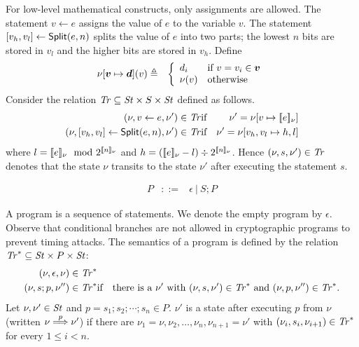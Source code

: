 For low-level mathematical constructs, only assignments are allowed.
The statement $v \leftarrow e$ assigns the value of $e$
to the variable $v$. The statement ${[}{v_h}, {v_l}{]} \leftarrow
\mbox{\textsf{Split}}(e, n)$ splits the value of $e$ into two parts;
the lowest $n$ bits are stored in $v_l$ and the higher bits
are stored in $v_h$. Define
\begin{eqnarray*}
\nu[\vv \mapsto \vd](v) & \defn &
\left\{
   \begin{array}{ll}
     d_i & \textmd{if $v = v_i \in \vv$}\\
     \nu(v) & \textmd{otherwise}
   \end{array}
\right.
\end{eqnarray*}
Consider the relation $\mathit{Tr} \subseteq \mathit{St} \times S \times \mathit{St}$ defined
as follows. 
\begin{eqnarray*}
  (\nu, v \leftarrow e, \nu') \in \mathit{Tr} & \textmd{if} &
  \nu' = \nu[v \mapsto [\![{e}]\!]_{\nu}]\\
  (\nu, {[}{v_h}, {v_l}{]} \leftarrow \mbox{\textsf{Split}} (e, n), \nu') \in
  \mathit{Tr} & \textmd{if} &
  \nu' = \nu[v_h, v_l \mapsto h, l]
\end{eqnarray*}
where
$l = [\![{e}]\!]_{\nu} \mod 2^{[\![{n}]\!]_{\nu}}$ and
$h = ([\![{e}]\!]_{\nu} - l) \div 2^{[\![{n}]\!]_{\nu}}$.
Hence $(\nu, s, \nu') \in \mathit{Tr}$ denotes that the state $\nu$ transits to 
the state $\nu'$ after executing the statement $s$.

\begin{eqnarray*}
  P & ::= & \epsilon \ |\ S; P
\end{eqnarray*}

A program is a sequence of statements. We denote the empty program by
$\epsilon$. Observe that conditional branches are not allowed in
cryptographic programs to prevent timing attacks. The semantics of a
program is defined by the relation 
$\mathit{Tr}^* \subseteq \mathit{St} \times P \times \mathit{St}$:
\begin{eqnarray*}
  (\nu, \epsilon, \nu) \in \mathit{Tr}^*\\
  (\nu, s; p, \nu'') \in \mathit{Tr}^* & \textmd{if} &
    \textmd{there is a } \nu' \textmd{ with }
    (\nu, s, \nu') \in \mathit{Tr}^* \textmd{ and }
    (\nu, p, \nu'') \in \mathit{Tr}^*.
\end{eqnarray*}
Let $\nu, \nu' \in \mathit{St}$ and $p = s_1; s_2; \cdots; s_n \in
P$. $\nu'$ is a state after executing $p$ from $\nu$
(written $\nu \overset{p}{\Longrightarrow} \nu'$) if there are $\nu_1 = \nu, \nu_2,
\ldots, \nu_n, \nu_{n+1} = \nu'$ with $(\nu_i, s_i, \nu_{i+1}) \in
\mathit{Tr}^*$ for every $1 \leq i < n$.


